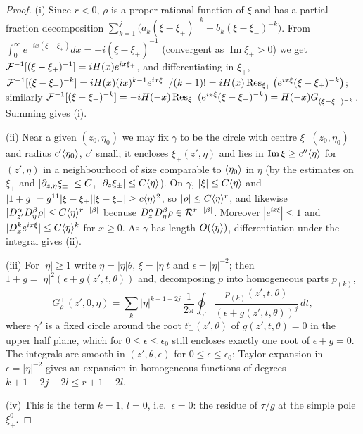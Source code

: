 \begin{proof}
(i) Since $r<0$, $\rho$ is a proper rational function of $\xi$ and has a partial
fraction decomposition $\sum_{k=1}^j\big(a_k(\xi-\xi_+)^{-k}+b_k(\xi-\xi_-)^{-k}\big)$.
From $\int_0^\infty e^{-ix(\xi-\xi_+)}dx=-i(\xi-\xi_+)^{-1}$ (convergent as
$\operatorname{Im}\xi_+>0$) we get $\mathcal{F}^{-1}[(\xi-\xi_+)^{-1}]=iH(x)e^{ix\xi_+}$, and
differentiating in $\xi_+$, $\mathcal{F}^{-1}[(\xi-\xi_+)^{-k}]=iH(x)(ix)^{k-1}e^{ix\xi_+}/
(k-1)!=iH(x)\operatorname{Res}_{\xi_+}\big(e^{ix\xi}(\xi-\xi_+)^{-k}\big)$; similarly
$\mathcal{F}^{-1}[(\xi-\xi_-)^{-k}]=-iH(-x)\operatorname{Res}_{\xi_-}(e^{ix\xi}(\xi-
\xi_-)^{-k})=H(-x)G^-_{(\xi-\xi_-)^{-k}}$. Summing gives (i).

(ii) Near a given $(z_0,\eta_0)$ we may fix $\gamma$ to be the circle with centre
$\xi_+(z_0,\eta_0)$ and radius $c'\langle \eta_0\rangle$, $c'$ small; it encloses
$\xi_+(z',\eta)$ and lies in $\operatorname{Im}\xi\ge c''\langle \eta\rangle$ for $(z',\eta)$
in a neighbourhood of size comparable to $\langle \eta_0\rangle$ in $\eta$ (by the estimates on
$\xi_\pm$ and $|\partial_{z,\eta}\xi_\pm|\le C$, $|\partial_z\xi_\pm|\le C\langle \eta\rangle$). On $\gamma$,
$|\xi|\le C\langle \eta\rangle$ and $|1+g|=g^{11}|\xi-\xi_+||\xi-\xi_-|\ge c\langle \eta\rangle^2$, so
$|\rho|\le C\langle \eta\rangle^r$, and likewise $|D_{z'}^\alpha D_\eta^\beta\rho|\le
C\langle \eta\rangle^{r-|\beta|}$ because $D_z^\alpha D_\eta^\beta\rho\in\mathcal{R}^{r-|\beta|}$.
Moreover $|e^{ix\xi}|\le1$ and $|D_x^ke^{ix\xi}|\le C\langle \eta\rangle^k$ for $x\ge0$. As
$\gamma$ has length $O(\langle \eta\rangle)$, differentiation under the integral gives (ii).

(iii) For $|\eta|\ge1$ write $\eta=|\eta|\theta$, $\xi=|\eta|t$ and $\epsilon=
|\eta|^{-2}$; then $1+g=|\eta|^2(\epsilon+g(z',t,\theta))$ and, decomposing $p$ into
homogeneous parts $p_{(k)}$,
\begin{equation*}
G^+_\rho(z',0,\eta)=\sum_k|\eta|^{k+1-2j}\,\frac1{2\pi}\oint_{\gamma'}\frac{p_{(k)}(z',t,
\theta)}{(\epsilon+g(z',t,\theta))^j}\,dt,
\end{equation*}
where $\gamma'$ is a fixed circle around the root $t^0_+(z',\theta)$ of
$g(z',t,\theta)=0$ in the upper half plane, which for $0\le\epsilon\le\epsilon_0$ still
encloses exactly one root of $\epsilon+g=0$. The integrals are smooth in
$(z',\theta,\epsilon)$ for $0\le\epsilon\le\epsilon_0$; Taylor expansion in $\epsilon=
|\eta|^{-2}$ gives an expansion in homogeneous functions of degrees $k+1-2j-2l\le
r+1-2l$.

(iv) This is the term $k=1$, $l=0$, i.e.\ $\epsilon=0$: the residue of $\tau/g$ at the
simple pole $\xi^0_+$.
\end{proof}

